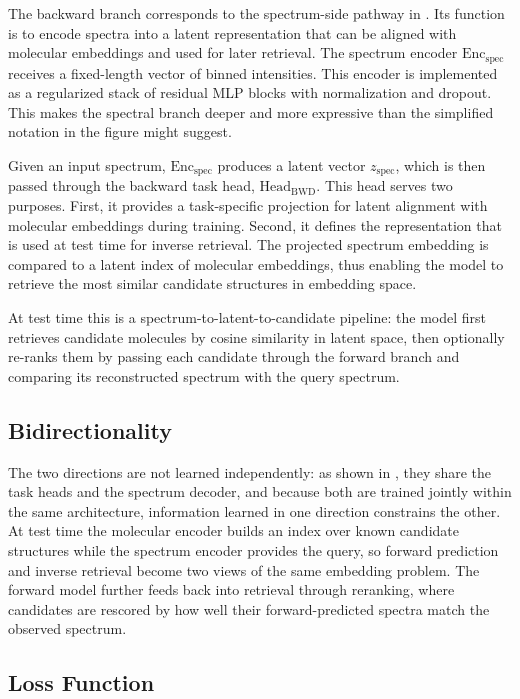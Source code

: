 The backward branch corresponds to the spectrum-side pathway in .
Its function is to encode spectra into a latent representation that can be aligned with molecular embeddings and used for later retrieval. The spectrum encoder $\mathrm{Enc}_{\mathrm{spec}}$ receives a fixed-length vector of binned intensities.
This encoder is implemented as a regularized stack of residual MLP blocks with normalization and dropout.
This makes the spectral branch deeper and more expressive than the simplified notation in the figure might suggest.

Given an input spectrum, $\mathrm{Enc}_{\mathrm{spec}}$ produces a latent vector $z_{\mathrm{spec}}$, which is then passed through the backward task head, \texttt{$\text{Head}_{\mathrm{BWD}}$}.
This head serves two purposes. First, it provides a task-specific projection for latent alignment with molecular embeddings during training.
Second, it defines the representation that is used at test time for inverse retrieval.
The projected spectrum embedding is compared to a latent index of molecular embeddings, thus enabling the model to retrieve the most similar candidate structures in embedding space.

At test time this is a spectrum-to-latent-to-candidate pipeline: the model first retrieves candidate molecules by cosine similarity in latent space, then optionally re-ranks them by passing each candidate through the forward branch and comparing its reconstructed spectrum with the query spectrum.

\subsection{Bidirectionality}

The two directions are not learned independently: as shown in , they share the task heads and the spectrum decoder, and because both are trained jointly within the same architecture, information learned in one direction constrains the other.
At test time the molecular encoder builds an index over known candidate structures while the spectrum encoder provides the query, so forward prediction and inverse retrieval become two views of the same embedding problem.
The forward model further feeds back into retrieval through reranking, where candidates are rescored by how well their forward-predicted spectra match the observed spectrum.

\subsection{Loss Function}
\label{sec:loss-function}

